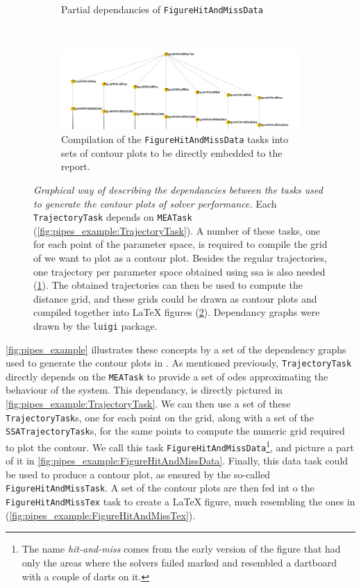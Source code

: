 \begin{figure}
\begin{subfigure}[t]{\textwidth}
        \caption{Partial dependancies of {\tt FigureHitAndMissData}}
        \label{fig:pipes_example:FigureHitAndMissData}
    \end{subfigure}
    ~
    \begin{subfigure}[t]{\textwidth}
        \includegraphics[width=\textwidth]{images/FigureHitAndMissTex.png}
        \caption{Compilation of the {\tt FigureHitAndMissData} tasks into sets of contour plots to be directly embedded to the report.}
        \label{fig:pipes_example:FigureHitAndMissTex}
    \end{subfigure}
    \caption{\emph{Graphical way of describing the dependancies between the tasks used to generate the contour plots of solver performance.} 
    Each  \texttt{TrajectoryTask} depends on \texttt{MEATask} (\ref{fig:pipes_example:TrajectoryTask}).
    A number of these tasks, one for each point of the parameter space, is required to compile the grid of we want to plot as a contour plot.
    Besides the regular trajectories, one trajectory per parameter space obtained using \acrlong{ssa} is also needed (\ref{fig:pipes_example:FigureHitAndMissData}).
    The obtained trajectories can then be used to compute the distance grid, and these grids could be drawn as contour plots and compiled together into \LaTeX{} figures (\ref{fig:pipes_example:FigureHitAndMissTex}).
    Dependancy graphs were drawn by the {\tt luigi} package. }
    \label{fig:pipes_example}
\end{figure}

\autoref{fig:pipes_example} illustrates these concepts by a set of the dependency graphs used to generate the contour plots in .
As mentioned previously, \verb"TrajectoryTask" directly depends on the \verb"MEATask" to provide a set of \glspl{ode} approximating the behaviour of the system. 
This dependancy, is directly pictured in \autoref{fig:pipes_example:TrajectoryTask}. 
We can then use a set of these \verb"TrajectoryTask"s, one for each point on the grid, along with a set of the \verb"SSATrajectoryTask"s, for the same points to compute the numeric grid required to plot the contour. We call this task \verb"FigureHitAndMissData"\footnote{The name \emph{hit-and-miss} comes from the early version of the figure that had only the areas where the solvers failed marked and resembled a dartboard with a couple of darts on it.}, and picture a part of it in \autoref{fig:pipes_example:FigureHitAndMissData}. 
Finally, this data task could be used to produce a contour plot, as ensured by the so-called \verb"FigureHitAndMissTask". 
A set of the contour plots are then fed int o the \verb"FigureHitAndMissTex" task to create a \LaTeX{} figure, much resembling the ones in  (\autoref{fig:pipes_example:FigureHitAndMissTex}).


